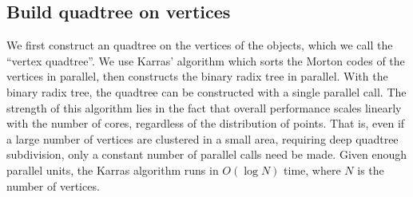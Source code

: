 \documentclass{egpubl}
\begin{document}
%
%

\subsection{Build quadtree on vertices}

We first construct an quadtree on the vertices of the objects, which we call the ``vertex quadtree''. We use Karras' algorithm \cite{karras2012maximizing} which sorts the Morton codes of the vertices in parallel, then constructs the binary radix tree in parallel. With the binary radix tree, the quadtree can be constructed with a single parallel call. The strength of this algorithm lies in the fact that overall performance scales linearly with the number of cores, regardless of the distribution of points. That is, even if a large number of vertices are clustered in a small area, requiring deep quadtree subdivision, only a constant number of parallel calls need be made. Given enough parallel units, the Karras algorithm runs in $O(\log{N})$ time, where $N$ is the number of vertices.
\end{document}
